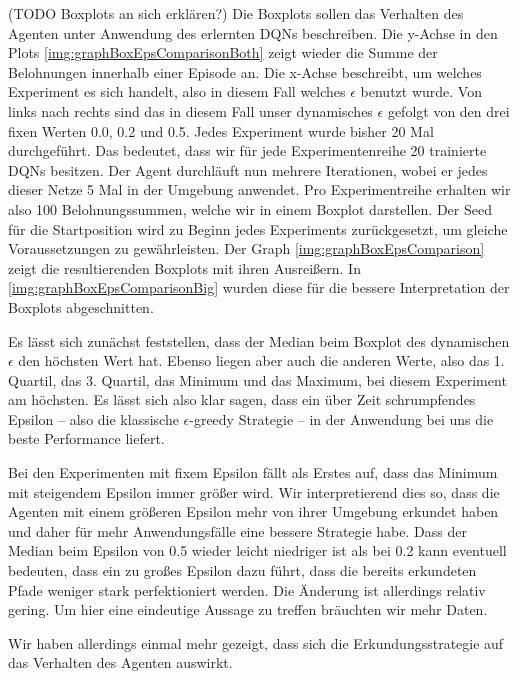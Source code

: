 (TODO Boxplots an sich erklären?) Die Boxplots sollen das Verhalten des Agenten unter Anwendung des erlernten DQNs beschreiben. Die y-Achse in den Plots \ref{img:graphBoxEpsComparisonBoth} zeigt wieder die Summe der Belohnungen innerhalb einer Episode an. Die x-Achse beschreibt, um welches Experiment es sich handelt, also in diesem Fall welches $ \epsilon $ benutzt wurde. Von links nach rechts sind das in diesem Fall unser dynamisches $ \epsilon $ gefolgt von den drei fixen Werten 0.0, 0.2 und 0.5. Jedes Experiment wurde bisher 20 Mal durchgeführt. Das bedeutet, dass wir für jede Experimentenreihe 20 trainierte DQNs besitzen. Der Agent durchläuft nun mehrere Iterationen, wobei er jedes dieser Netze 5 Mal in der Umgebung anwendet. Pro Experimentreihe erhalten wir also 100 Belohnungssummen, welche wir in einem Boxplot darstellen. Der Seed für die Startposition wird zu Beginn jedes Experiments zurückgesetzt, um gleiche Voraussetzungen zu gewährleisten. Der Graph \ref{img:graphBoxEpsComparison} zeigt die resultierenden Boxplots mit ihren Ausreißern. In \ref{img:graphBoxEpsComparisonBig} wurden diese für die bessere Interpretation der Boxplots abgeschnitten.

Es lässt sich zunächst feststellen, dass der Median beim Boxplot des dynamischen $ \epsilon $ den höchsten Wert hat. Ebenso liegen aber auch die anderen Werte, also das 1. Quartil, das 3. Quartil, das Minimum und das Maximum, bei diesem Experiment am höchsten. Es lässt sich also klar sagen, dass ein über Zeit schrumpfendes Epsilon -- also die klassische $ \epsilon $-greedy Strategie -- in der Anwendung bei uns die beste Performance liefert.

Bei den Experimenten mit fixem Epsilon fällt als Erstes auf, dass das Minimum mit steigendem Epsilon immer größer wird. Wir interpretierend dies so, dass die Agenten mit einem größeren Epsilon mehr von ihrer Umgebung erkundet haben und daher für mehr Anwendungsfälle eine bessere Strategie habe. Dass der Median beim Epsilon von 0.5 wieder leicht niedriger ist als bei 0.2 kann eventuell bedeuten, dass ein zu großes Epsilon dazu führt, dass die bereits erkundeten Pfade weniger stark perfektioniert werden. Die Änderung ist allerdings relativ gering. Um hier eine eindeutige Aussage zu treffen bräuchten wir mehr Daten.

Wir haben allerdings einmal mehr gezeigt, dass sich die Erkundungsstrategie auf das Verhalten des Agenten auswirkt.

